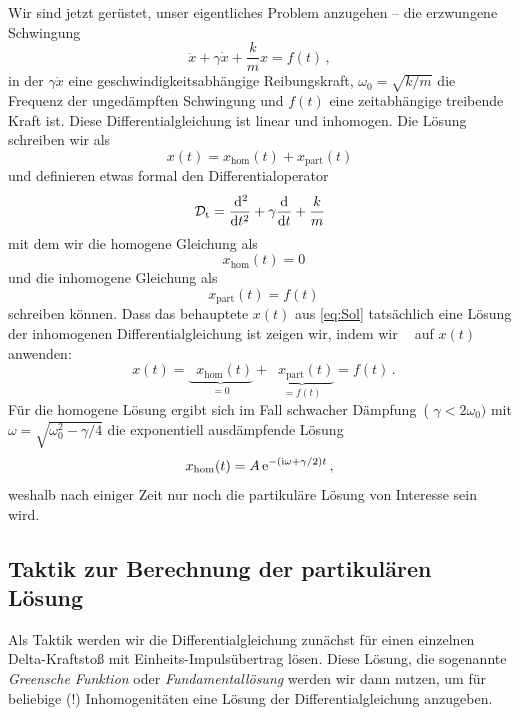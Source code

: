 \documentclass[paper=a4, fontsize=11.0pt, abstractoff, DIV12]{scrartcl}
\newcommand{\xhom}{\ensuremath{x_\mathrm{hom}}}
\newcommand{\xinhom}{\ensuremath{x_\mathrm{part}}}
\DeclareMathOperator{\Dt}{\mathcal{D}_t}
\begin{document}
Wir sind jetzt gerüstet, unser eigentliches Problem anzugehen -- die erzwungene
Schwingung
\begin{equation}
\ddot{x} + \gamma\dot{x} + \frac{k}{m}x = f(t)\,,
\end{equation}
in der $\gamma \dot{x}$ eine geschwindigkeitsabhängige Reibungskraft,
$\omega_0 = \sqrt{k/m}$ die Frequenz der ungedämpften Schwingung und $f(t)$
eine zeitabhängige treibende Kraft ist. Diese Differentialgleichung ist linear
und inhomogen. Die Lösung schreiben wir als
\begin{equation}
x(t) = \xhom(t) + \xinhom(t)
\label{eq:Sol}
\end{equation}
und definieren etwas formal den Differentialoperator
\begin{equation}
\Dt = \secondderiv{}{t} + \gamma\firstderiv{}{t} + \frac{k}{m}
\end{equation}
mit dem wir die homogene Gleichung als
\begin{equation}
\Dt \xhom(t) = 0
\end{equation}
und die inhomogene Gleichung als
\begin{equation}
\Dt \xinhom(t) = f(t)
\end{equation}
schreiben können. Dass das behauptete $x(t)$ aus \eqref{eq:Sol} tatsächlich
eine Lösung der inhomogenen Differentialgleichung ist zeigen wir, indem wir
$\Dt$ auf $x(t)$ anwenden:
\begin{equation}
\Dt x(t) = \underbrace{\Dt \xhom(t)}_{=0} + \underbrace{\Dt \xinhom(t)}_{=f(t)} = f(t)\,.
\end{equation}
Für die homogene Lösung ergibt sich im Fall \glqq schwacher Dämpfung\grqq~(
$\gamma < 2\omega_0)$ mit $\omega = \sqrt{\omega_0^2 - \gamma/4}$ die
exponentiell ausdämpfende Lösung
\begin{equation}
\xhom(t) = A \eto{-(\ii \omega + \gamma/2)t}\,,
\end{equation}
weshalb nach einiger Zeit nur noch die partikuläre Lösung von Interesse sein
wird.

\subsection{Taktik zur Berechnung der partikulären Lösung}

Als Taktik werden wir die Differentialgleichung zunächst für einen einzelnen
Delta-Kraftstoß mit Einheits-Impulsübertrag lösen. Diese Lösung, die
sogenannte \emph{Greensche Funktion} oder \emph{Fundamentallösung} werden
wir dann nutzen, um für beliebige (!) Inhomogenitäten eine Lösung der
Differentialgleichung anzugeben.
\end{document}
